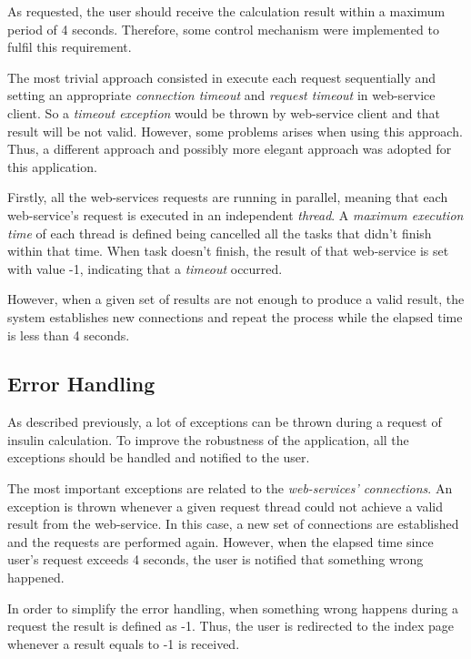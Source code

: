     As requested, the user should receive the calculation result within a maximum period of 4 seconds. Therefore, some control mechanism were implemented to fulfil this requirement.
    
    The most trivial approach consisted in execute each request sequentially and setting an appropriate \emph{connection timeout} and \emph{request timeout} in web-service client. So a \emph{timeout exception} would be thrown by web-service client and that result will be not valid. However, some problems arises when using this approach. Thus, a different approach and possibly more elegant approach was adopted for this application.
    
    Firstly, all the web-services requests are running in parallel, meaning that each web-service's request is executed in an independent \emph{thread}. A \emph{maximum execution time} of each thread is defined being cancelled all the tasks that didn't finish within that time. When task doesn't finish, the result of that web-service is set with value -1, indicating that a \emph{timeout} occurred.
    
    However, when a given set of results are not enough to produce a valid result, the system establishes new connections and repeat the process while the elapsed time is less than 4 seconds.
    
\subsection{Error Handling}

    As described previously, a lot of exceptions can be thrown during a request of insulin calculation. To improve the robustness of the application, all the exceptions should be handled and notified to the user.
    
    The most important exceptions are related to the \emph{web-services' connections}. An exception is thrown whenever a given request thread could not achieve a valid result from the web-service. In this case, a new set of connections are established and the requests are performed again. However, when the elapsed time since user's request exceeds 4 seconds, the user is notified that something wrong happened.
    
    In order to simplify the error handling, when something wrong happens during a request the result is defined as -1. Thus, the user is redirected to the index page whenever a result equals to -1 is received.
